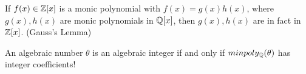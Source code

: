 
\begin{proposition}
If $f(x) \in \mathbb{Z}[x]$ is a monic polynomial with $f(x) = g(x)h(x)$, where $g(x), h(x)$ are monic polynomials in $\mathbb{Q}[x]$, then $g(x), h(x)$ are in fact in $\mathbb{Z}[x]$. (Gauss's Lemma)
\end{proposition}

\begin{proposition}
An algebraic number $\theta$ is an algebraic integer if and only if $minpoly_{\mathbb{Q}}(\theta)$ has integer coefficients!
\end{proposition}

